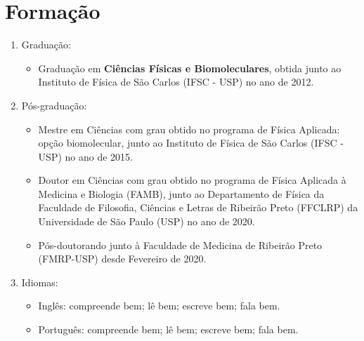 \documentclass[a4paper,oneside,10pt]{article}
\begin{document}
\section{Formação}
\large{
\begin{enumerate}
        \item Graduação:
        \begin{itemize}
                \item Graduação em \textbf{Ciências Físicas e Biomoleculares}, obtida junto ao Instituto de Física de São Carlos (IFSC - USP) no ano de 2012. \mbox{} \\
        \end{itemize}

        \item Pós-graduação:
        \begin{itemize}
                \item Mestre em Ciências com grau obtido no programa de Física Aplicada: opção biomolecular, junto ao Instituto de Física de São Carlos (IFSC - USP) no ano de 2015. \mbox{} \\
                \item Doutor em Ciências com grau obtido no programa de Física Aplicada à Medicina e Biologia (FAMB), junto ao Departamento de Física da Faculdade de Filosofia, Ciências e Letras de Ribeirão Preto (FFCLRP) da Universidade de São Paulo (USP) no ano de 2020. \mbox{} \\
                \item Pós-doutorando junto à Faculdade de Medicina de Ribeirão Preto (FMRP-USP) desde Fevereiro de 2020. \mbox{}
        \end{itemize}

        \item Idiomas:
        \begin{itemize}
                \item Inglês: compreende bem; lê bem; escreve bem; fala bem.
                \item Português: compreende bem; lê bem; escreve bem; fala bem.
        \end{itemize}
\end{enumerate}}

\newpage
\end{document}
